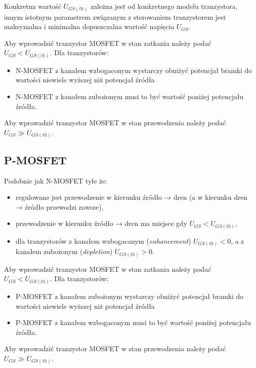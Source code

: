 \documentclass{pdfBooklets}
\begin{document}
Konkretna wartość $U_{GS (th)}$ zależna jest od konkretnego modelu tranzystora, innym istotnym parametrem związanym z sterowaniem tranzystorem jest maksymalna i minimalna dopuszczalna wartość napięcia $U_{GS}$.

Aby wprowadzić tranzystor MOSFET w stan zatkania należy podać $U_{GS} < U_{GS (th)}$. Dla tranzystorów:
\begin{itemize}
\item N-MOSFET z kanałem wzbogaconym wystarczy obniżyć potencjał bramki do wartości niewiele wyższej niż potencjał źródła
\item N-MOSFET z kanałem zubożonym musi to być wartość poniżej potencjału źródła.
\end{itemize}
Aby wprowadzić tranzystor MOSFET w stan przewodzenia należy podać $U_{GS} \gg U_{GS (th)}$.

\subsection{P-MOSFET}
Podobnie jak N-MOSFET tyle że:
\begin{itemize}
\item regulowane jest przewodzenie w kierunku źródło → dren (a w kierunku dren → źródło przewodzi zawsze),
\item przewodzenie w kierunku źródło → dren ma miejsce gdy $U_{GS} < U_{GS (th)}$,
\item dla tranzystorów z kanałem wzbogacanym (\emph{enhancement}) $U_{GS (th)} < 0$, a z kanałem zubożonym (\emph{depletion}) $U_{GS (th)} > 0$.
\end{itemize}

Aby wprowadzić tranzystor MOSFET w stan zatkania należy podać $U_{GS} < U_{GS (th)}$. Dla tranzystorów:
\begin{itemize}
\item P-MOSFET z kanałem zubożonym wystarczy obniżyć potencjał bramki do wartości niewiele wyższej niż potencjał źródła
\item P-MOSFET z kanałem wzbogaconym musi to być wartość poniżej potencjału źródła.
\end{itemize}
Aby wprowadzić tranzystor MOSFET w stan przewodzenia należy podać $U_{GS} \gg U_{GS (th)}$.

\vspace{12pt}
\end{document}
